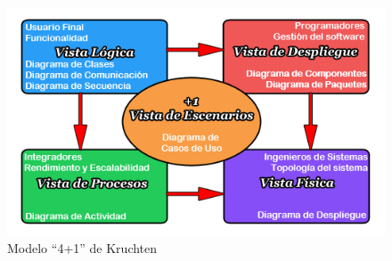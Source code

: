 \begin{figure}[H]
    \begin{center}
    \includegraphics[width=\textwidth]{vistas.png}
    \caption{Modelo “4+1” de Kruchten}
    \label{fig:vistas}
    \end{center}
\end{figure}
